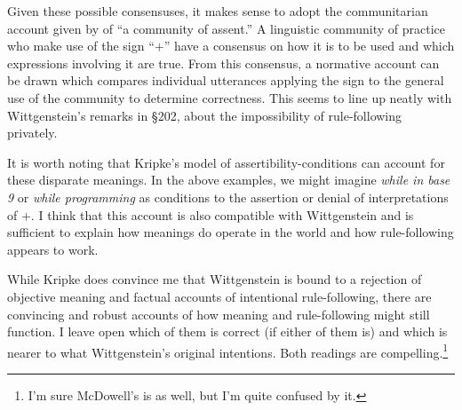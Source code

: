 \documentclass[doc,12pt,apacite,biblatex]{apa6}
\begin{document}
Given these possible consensuses, it makes sense to adopt the communitarian account given by  of ``a community of assent.'' A linguistic community of practice who make use of the sign ``$+$'' have a consensus on how it is to be used and which expressions involving it are true. From this consensus, a normative account can be drawn which compares individual utterances applying the sign to the general use of the community to determine correctness. This seems to line up neatly with Wittgenstein's remarks in \S 202, about the impossibility of rule-following privately.


It is worth noting that Kripke's model of assertibility-conditions can account for these disparate meanings. In the above examples, we might imagine \emph{while in base 9} or \emph{while programming} as conditions to the assertion or denial of interpretations of $+$. I think that this account is also compatible with Wittgenstein and is sufficient to explain how meanings do operate in the world and how rule-following appears to work. 

While Kripke does convince me that Wittgenstein is bound to a rejection of objective meaning and factual accounts of intentional rule-following, there are convincing and robust accounts of how meaning and rule-following might still function. I leave open which of them is correct (if either of them is) and which is nearer to what Wittgenstein's original intentions. Both readings are compelling.\footnote{I'm sure McDowell's is as well, but I'm quite confused by it.}

\clearpage

{}  \printindex[autx]
\end{document}
